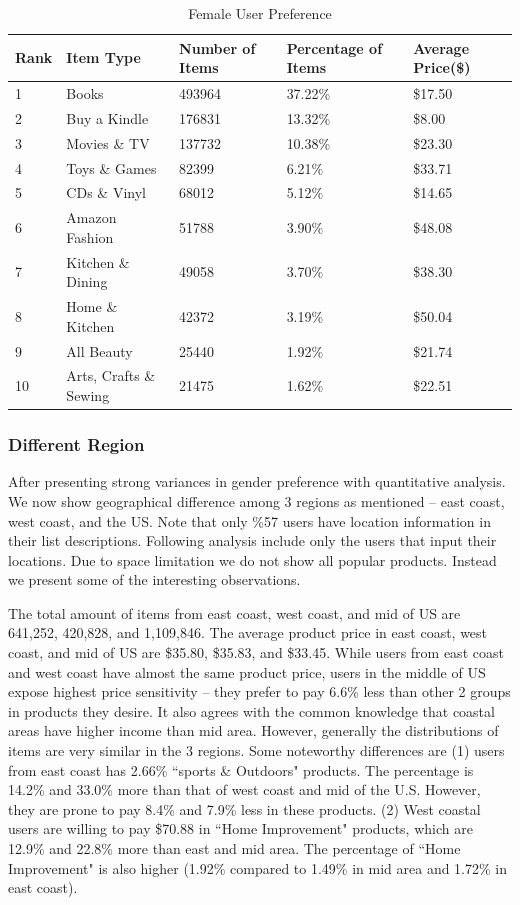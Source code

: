 \begin{table}[t]
\centering
\caption{Female User Preference}
\label{tb:female}
\begin{adjustbox}{max width=.5\textwidth}
\begin{tabular}{lllll}
Rank & Item Type          & Number of Items & Percentage of Items & Average Price(\$) \\ \hline
1 & Books & 493964 & 37.22\% & \$17.50 \\
2 & Buy a Kindle & 176831 & 13.32\% & \$8.00 \\
3 & Movies \& TV & 137732 & 10.38\% & \$23.30 \\
4 & Toys \& Games & 82399 & 6.21\% & \$33.71 \\
5 & CDs \& Vinyl & 68012 & 5.12\% & \$14.65 \\
6 & Amazon Fashion & 51788 & 3.90\% & \$48.08 \\
7 & Kitchen \& Dining & 49058 & 3.70\% & \$38.30 \\
8 & Home \& Kitchen & 42372 & 3.19\% & \$50.04 \\
9 & All Beauty & 25440 & 1.92\% & \$21.74 \\
10 & Arts, Crafts \& Sewing & 21475 & 1.62\% & \$22.51 \\
\end{tabular}
\end{adjustbox}
\end{table}

\subsubsection{Different Region}

After presenting strong variances in gender preference with quantitative analysis. We now show geographical difference among 3 regions as mentioned -- east coast, west coast, and the US. Note that only \%57 users have location information in their list descriptions. Following analysis include only the users that input their locations. Due to space limitation we do not show all popular products. Instead we present some of the interesting observations. 

The total amount of items from east coast, west coast, and mid of US are 641,252, 420,828, and 1,109,846. The average product price in east coast, west coast, and mid of US are \$35.80, \$35.83, and \$33.45. While users from east coast and west coast have almost the same product price, users in the middle of US expose highest price sensitivity -- they prefer to pay 6.6\% less than other 2 groups in products they desire. It also agrees with the common knowledge that coastal areas have higher income than mid area. However, generally the distributions of items are very similar in the 3 regions. Some noteworthy differences are (1) users from east coast has 2.66\% ``sports \& Outdoors" products. The percentage is 14.2\% and 33.0\% more than that of west coast and mid of the U.S. However, they are prone to pay 8.4\% and 7.9\% less in these products. (2) West coastal users are willing to pay \$70.88 in ``Home Improvement" products, which are 12.9\% and 22.8\% more than east and mid area. The percentage of ``Home Improvement" is also higher (1.92\% compared to 1.49\% in mid area and 1.72\% in east coast). 


